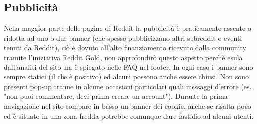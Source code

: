 \documentclass[12pt]{article}
\begin{document}
\subsection{Pubblicit\`a} %
Nella maggior parte delle pagine di Reddit la pubblicit\`a \`e praticamente assente o ridotta ad uno o due banner (che spesso pubblicizzano altri subreddit o eventi tenuti da Reddit), ci\`o \`e dovuto all'alto finanziamento ricevuto dalla community tramite l'iniziativa Reddit Gold, non approfondir\`o questo aspetto perch\`e esula dall'analisi del sito ma \`e spiegato nelle FAQ nel footer. In ogni caso i banner sono sempre statici (il che \`e positivo) ed alcuni possono anche essere chiusi. Non sono presenti pop-up tranne in alcune occasioni particolari quali messaggi d'errore (es. "non puoi commentare, devi prima creare un account"). Durante la prima navigazione nel sito compare in basso un banner dei cookie, anche se risalta poco ed \`e situato in una zona fredda potrebbe comunque dare fastidio ad alcuni utenti.

\newpage
\end{document}
